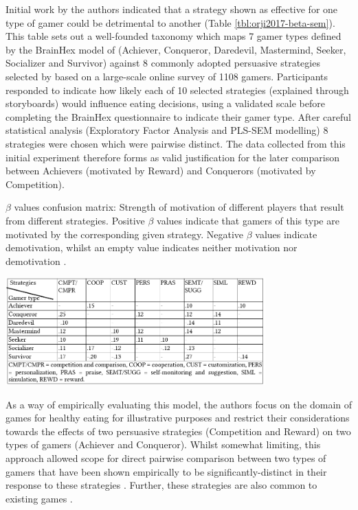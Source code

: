 \documentclass[11pt]{article}
\begin{document}
Initial work by the authors indicated that a strategy shown as effective for one type of gamer could be detrimental to another \citep{orji2013a} (Table \ref{tbl:orji2017-beta-sem}). This table sets out a well-founded taxonomy which maps 7 gamer types defined by the BrainHex model of \citet{nacke2014} (Achiever, Conqueror, Daredevil, Mastermind, Seeker, Socializer and Survivor) against 8 commonly adopted persuasive strategies selected by \citet{gerling2014} based on a large-scale online survey of 1108 gamers.  Participants responded to indicate how likely each of 10 selected strategies (explained through storyboards) would influence eating decisions, using a validated scale \citep{drozd2012} before completing the BrainHex questionnaire to indicate their gamer type. After careful statistical analysis (Exploratory Factor Analysis and PLS-SEM modelling) 8 strategies were chosen which were pairwise distinct. The data collected from this initial experiment therefore forms as valid justification for the later comparison between Achievers (motivated by Reward) and Conquerors (motivated by Competition). 

\begin{table}[H]
\centering
\caption{$\beta$ values confusion matrix: Strength of motivation of different players that result from different strategies. Positive $\beta$ values indicate that gamers of this type are motivated by the corresponding given strategy. Negative $\beta$ values indicate demotivation, whilst an empty value indicates neither motivation nor demotivation \protect\citep{orji2013a}.
}\label{tbl:orji2017-beta-sem}
\includegraphics[width=0.75\textwidth]{img/orji2017-beta-sem.png} 
\end{table}

As a way of empirically evaluating this model, the authors focus on the domain of games for healthy eating for illustrative purposes and restrict their considerations towards the effects of two persuasive strategies (Competition and Reward) on two types of gamers (Achiever and Conqueror). Whilst somewhat limiting, this approach allowed scope for direct pairwise comparison between two types of gamers that have been shown empirically to be significantly-distinct in their response to these strategies \citep{orji2013a}. Further, these strategies are also common to existing games \citep{bell2006}. 
\end{document}
